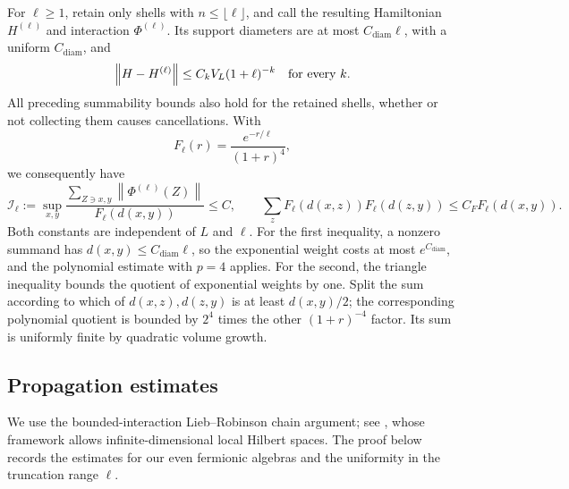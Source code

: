 \documentclass[11pt]{article}
\theoremstyle{definition}
\theoremstyle{remark}
\newcommand{\norm}[1]{\left\lVert#1\right\rVert}
\begin{document}
For \(\ell\ge1\), retain only shells with \(n\le\lfloor\ell\rfloor\),
and call the resulting Hamiltonian \(H^{(\ell)}\) and interaction
\(\Phi^{(\ell)}\).  Its support diameters are at most \(C_{\mathrm{diam}}\ell\),
with a uniform \(C_{\mathrm{diam}}\), and
\[
 \norm{H-H^{(\ell)}}\le C_kV_L(1+\ell)^{-k}
 \quad\hbox{for every }k.
\]
All preceding summability bounds also hold for the retained shells,
whether or not collecting them causes cancellations.  With
\[
 F_\ell(r)=\frac{e^{-r/\ell}}{(1+r)^4},
\]
we consequently have
\begin{equation}\label{eq:Fbound}
 \mathcal I_\ell:=
 \sup_{x,y}
 \frac{\displaystyle\sum_{Z\ni x,y}\norm{\Phi^{(\ell)}(Z)}}
      {F_\ell(d(x,y))}
 \le C,
 \qquad
 \sum_z F_\ell(d(x,z))F_\ell(d(z,y))
 \le C_F F_\ell(d(x,y)).
\end{equation}
Both constants are independent of \(L\) and \(\ell\).
For the first inequality, a nonzero summand has
\(d(x,y)\le C_{\mathrm{diam}}\ell\), so the exponential weight costs at most
\(e^{C_{\mathrm{diam}}}\), and the polynomial estimate with \(p=4\) applies.
For the second, the triangle inequality bounds the quotient of
exponential weights by one.  Split the sum according to which
of \(d(x,z),d(z,y)\) is at least \(d(x,y)/2\); the corresponding
polynomial quotient is bounded by \(2^4\) times the other
\((1+r)^{-4}\) factor.  Its sum is uniformly finite by quadratic
volume growth.

\subsection{Propagation estimates}

We use the bounded-interaction Lieb--Robinson chain argument;
see \cite[Section~3.1, Theorem~3.1]{NSY19}, whose framework allows
infinite-dimensional local Hilbert spaces.  The proof below records
the estimates for our even fermionic algebras and the uniformity in
the truncation range \(\ell\).
\end{document}

